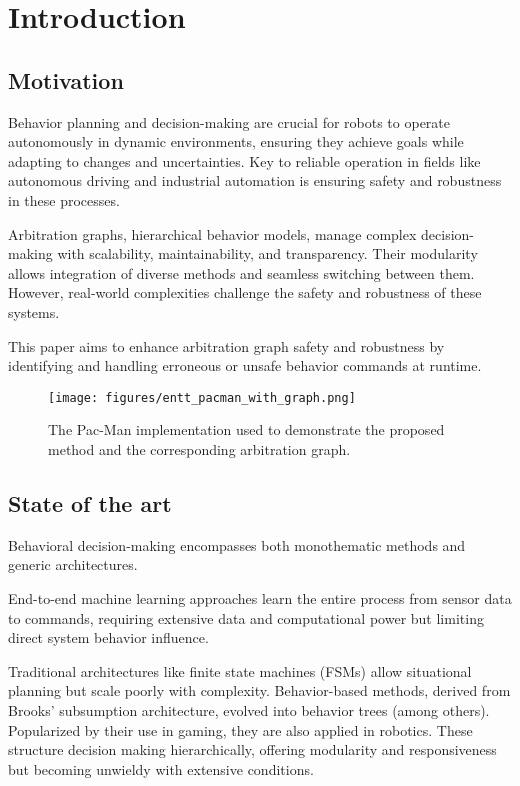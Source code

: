 \section{Introduction}

\subsection{Motivation}

Behavior planning and decision-making are crucial for robots to operate autonomously in dynamic environments, ensuring they achieve goals while adapting to changes and uncertainties.
Key to reliable operation in fields like autonomous driving and industrial automation is ensuring safety and robustness in these processes.

Arbitration graphs, hierarchical behavior models, manage complex decision-making with scalability, maintainability, and transparency.
Their modularity allows integration of diverse methods and seamless switching between them.
However, real-world complexities challenge the safety and robustness of these systems.

This paper aims to enhance arbitration graph safety and robustness by identifying and handling erroneous or unsafe behavior commands at runtime.

\begin{figure}
    \centering
    \texttt{[image: figures/entt\_pacman\_with\_graph.png]}
    \caption{The Pac-Man implementation used to demonstrate the proposed method and the corresponding arbitration graph.}
    \label{fig:entt-pacman}
\end{figure}

\subsection{State of the art}
Behavioral decision-making encompasses both monothematic methods and generic architectures.

End-to-end machine learning approaches learn the entire process from sensor data to commands, requiring extensive data and computational power but limiting direct system behavior influence.

Traditional architectures like finite state machines (FSMs) allow situational planning but scale poorly with complexity. Behavior-based methods, derived from Brooks' subsumption architecture, evolved into behavior trees (among others). Popularized by their use in gaming, they are also applied in robotics. These structure decision making hierarchically, offering modularity and responsiveness but becoming unwieldy with extensive conditions.

